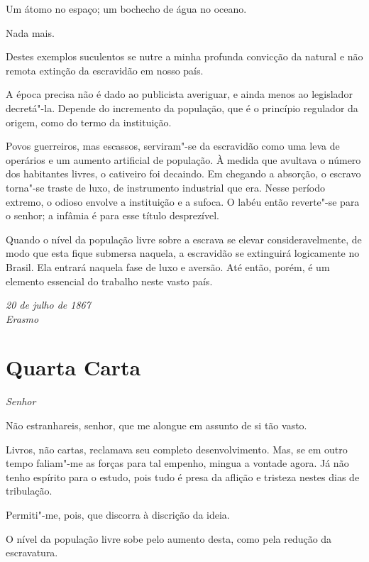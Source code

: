 Um átomo no espaço; um bochecho de água no oceano. 

Nada mais.

Destes exemplos suculentos se nutre a minha profunda convicção da
natural e não remota extinção da escravidão em nosso país.

A época precisa não é dado ao publicista averiguar, e ainda menos ao
legislador decretá"-la. Depende do incremento da população, que é o
princípio regulador da origem, como do termo da instituição.

Povos guerreiros, mas escassos, serviram"-se da escravidão como uma
leva de operários e um aumento artificial de população. À medida que
avultava o número dos habitantes livres, o cativeiro foi decaindo. Em
chegando a absorção, o escravo torna"-se traste de luxo, de
instrumento industrial que era. Nesse período extremo, o odioso envolve
a instituição e a sufoca. O labéu então reverte"-se para o senhor; a
infâmia é para esse título desprezível.

Quando o nível da população livre sobre a escrava se elevar 		\EP[-2]
consideravelmente, de modo que esta fique submersa naquela, a
escravidão se extinguirá logicamente no Brasil. Ela entrará naquela
fase de luxo e aversão. Até então, porém, é um elemento essencial do
trabalho neste vasto país.

\begin{flushright}
\textit{20 de julho de 1867\\ 
Erasmo}
\end{flushright}

\chapter[Quarta Carta]{Quarta Carta }

\noindent\textit{Senhor}

\sectionitem

Não estranhareis, senhor, que me alongue em assunto de si tão vasto.

 Livros, não cartas, reclamava seu completo desenvolvimento. Mas, se em
outro tempo faliam"-me as forças para tal empenho, mingua a vontade
agora. Já não tenho espírito para o estudo, pois tudo é presa da
aflição e tristeza nestes dias de tribulação. 

 Permiti"-me, pois, que discorra à discrição da ideia. 

 O nível da população livre sobe pelo aumento desta, como pela redução
da escravatura.

